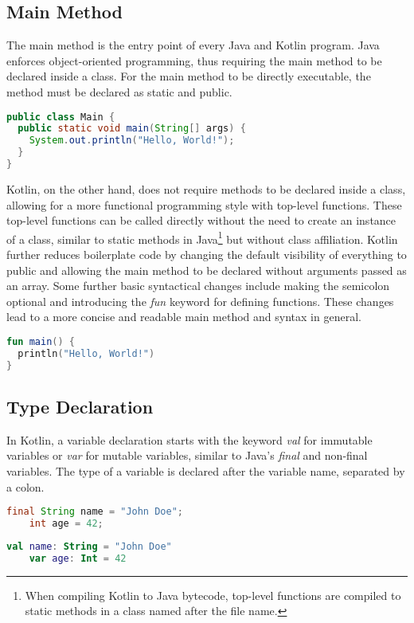 \documentclass[a4paper, 11pt]{article}
\begin{document}
\subsection{Main Method}
  The main method is the entry point of every Java and Kotlin program.
  Java enforces object-oriented programming, thus requiring the main method to be declared inside a class.
  For the main method to be directly executable, the method must be declared as static and public.
  \begin{lstlisting}[language=Java,title={Java main method}]
public class Main {
  public static void main(String[] args) {
    System.out.println("Hello, World!");
  }
}
\end{lstlisting}
  Kotlin, on the other hand, does not require methods to be declared inside a class, allowing for a more functional programming style with top-level functions.\cite{kotlin-functions-scope}
  These top-level functions can be called directly without the need to create an instance of a class, similar to static methods in Java\footnote{When compiling Kotlin to Java bytecode, top-level functions are compiled to static methods in a class named after the file name.} but without class affiliation.
  Kotlin further reduces boilerplate code by changing the default visibility of everything to public and allowing the main method to be declared without arguments passed as an array.\cite{visibility-modifiers,program-entry-point}
  Some further basic syntactical changes include making the semicolon optional and introducing the \textit{fun} keyword for defining functions.
  These changes lead to a more concise and readable main method and syntax in general.

\begin{lstlisting}[language=Kotlin,title={Kotlin main method}]
fun main() {
  println("Hello, World!")
}
\end{lstlisting}

\subsection{Type Declaration}
  In Kotlin, a variable declaration starts with the keyword \textit{val} for immutable variables or \textit{var} for mutable variables, similar to Java's \textit{final} and non-final variables.
  The type of a variable is declared after the variable name, separated by a colon.
\begin{lstlisting}[language=Java,title={Java data types}]
    final String name = "John Doe";
    int age = 42;
  \end{lstlisting}
  \begin{lstlisting}[language=Kotlin,title={Kotlin data types}]
    val name: String = "John Doe"
    var age: Int = 42
  \end{lstlisting}
\end{document}
